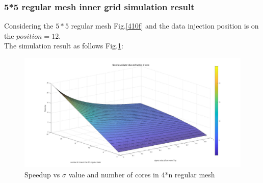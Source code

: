 \vspace*{50pt}
\subsubsection{5*5 regular mesh inner grid simulation result}
Considering the $5*5 $ regular mesh Fig.\ref{410f} and the data injection position is on the $position = 12$.
\\
The simulation result as follows Fig.\ref{noinner4n}:

\begin{figure}[h]
\centering\includegraphics[width=0.85\linewidth]{figure/noinner4n}
\caption{Speedup vs $\sigma$ value and number of cores in 4*n regular mesh}
\label{noinner4n}
\end{figure}
